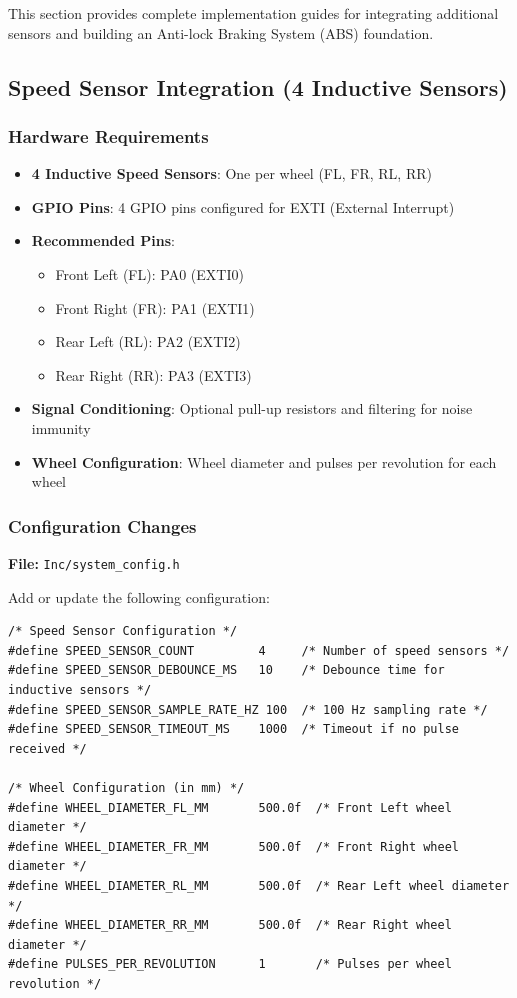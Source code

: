 \documentclass[11pt,a4paper]{article}
\begin{document}
This section provides complete implementation guides for integrating additional sensors and building an Anti-lock Braking System (ABS) foundation.

\subsection{Speed Sensor Integration (4 Inductive Sensors)}

\subsubsection{Hardware Requirements}
\begin{itemize}
    \item \textbf{4 Inductive Speed Sensors}: One per wheel (FL, FR, RL, RR)
    \item \textbf{GPIO Pins}: 4 GPIO pins configured for EXTI (External Interrupt)
    \item \textbf{Recommended Pins}: 
    \begin{itemize}
        \item Front Left (FL): PA0 (EXTI0)
        \item Front Right (FR): PA1 (EXTI1)
        \item Rear Left (RL): PA2 (EXTI2)
        \item Rear Right (RR): PA3 (EXTI3)
    \end{itemize}
    \item \textbf{Signal Conditioning}: Optional pull-up resistors and filtering for noise immunity
    \item \textbf{Wheel Configuration}: Wheel diameter and pulses per revolution for each wheel
\end{itemize}

\subsubsection{Configuration Changes}

\textbf{File:} \texttt{Inc/system\_config.h}

Add or update the following configuration:

\begin{lstlisting}[caption=Speed Sensor Configuration, label=lst:speedconfig]
/* Speed Sensor Configuration */
#define SPEED_SENSOR_COUNT         4     /* Number of speed sensors */
#define SPEED_SENSOR_DEBOUNCE_MS   10    /* Debounce time for inductive sensors */
#define SPEED_SENSOR_SAMPLE_RATE_HZ 100  /* 100 Hz sampling rate */
#define SPEED_SENSOR_TIMEOUT_MS    1000  /* Timeout if no pulse received */

/* Wheel Configuration (in mm) */
#define WHEEL_DIAMETER_FL_MM       500.0f  /* Front Left wheel diameter */
#define WHEEL_DIAMETER_FR_MM       500.0f  /* Front Right wheel diameter */
#define WHEEL_DIAMETER_RL_MM       500.0f  /* Rear Left wheel diameter */
#define WHEEL_DIAMETER_RR_MM       500.0f  /* Rear Right wheel diameter */
#define PULSES_PER_REVOLUTION      1       /* Pulses per wheel revolution */
\end{lstlisting}
\end{document}
